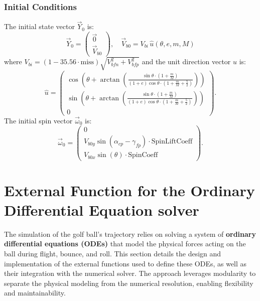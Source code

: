 \documentclass[10pt,a4paper]{report}
\begin{document}
\subsubsection{Initial Conditions}
The initial state vector $\vec{Y}_0$ is:
\begin{equation}
    \vec{Y}_0 = \begin{pmatrix} \vec{0} \\ \vec{V}_{b0} \end{pmatrix}, \quad \vec{V}_{b0} = V_{bi} \, \hat{u}(\theta, e, m, M)
    \label{eq:tensor_initial}
\end{equation}
where $V_{bi} = (1 - 35.56 \cdot \text{miss}) \sqrt{V_{bfn}^2 + V_{bfp}^2}$ and the unit direction vector $\hat{u}$ is:
\begin{equation}
    \hat{u} = \begin{pmatrix}
    \cos\left( \theta + \arctan\left( \frac{\sin \theta \cdot (1 + \frac{m}{M})}{(1 + e) \cos \theta \cdot (1 + \frac{m}{M} + \frac{5}{2})} \right) \right) \\
    \sin\left( \theta + \arctan\left( \frac{\sin \theta \cdot (1 + \frac{m}{M})}{(1 + e) \cos \theta \cdot (1 + \frac{m}{M} + \frac{5}{2})} \right) \right) \\
    0
    \end{pmatrix}.
    \label{eq:tensor_direction}
\end{equation}
The initial spin vector $\vec{\omega}_0$ is:
\begin{equation}
    \vec{\omega}_0 = \begin{pmatrix}
    0 \\
    V_{b0y} \sin(\alpha_{cp} - \gamma_{fp}) \cdot \text{SpinLiftCoeff} \\
    V_{b0x} \sin(\theta) \cdot \text{SpinCoeff}
    \end{pmatrix}.
    \label{eq:tensor_spin}
\end{equation}


\section{External Function for the Ordinary Differential Equation solver}
\label{sec:ode_functions}

The simulation of the golf ball's trajectory relies on solving a system of \textbf{ordinary differential equations (ODEs)} 
that model the physical forces acting on the ball during flight, bounce, and roll. This section 
details the design and implementation of the external functions used to define these ODEs, as well as 
their integration with the numerical solver. The approach leverages modularity to separate the physical 
modeling from the numerical resolution, enabling flexibility and maintainability.
\end{document}
